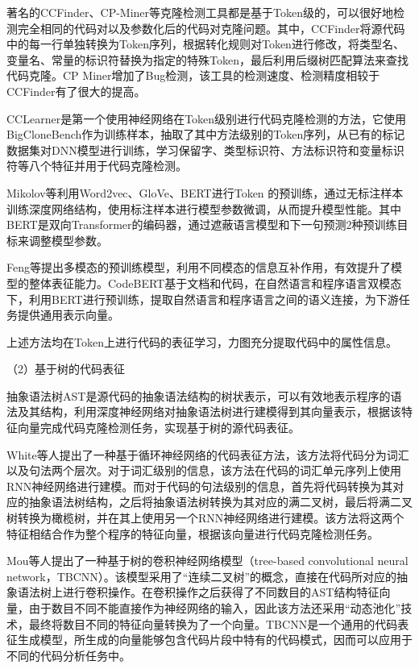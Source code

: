 著名的CCFinder\cite{1019480}、CP-Miner\cite{1610609}等克隆检测工具都是基于Token级的，可以很好地检测完全相同的代码对以及参数化后的代码对克隆问题。其中，CCFinder将源代码中的每一行单独转换为Token序列，根据转化规则对Token进行修改，将类型名、变量名、常量的标识符替换为指定的特殊Token，最后利用后缀树匹配算法来查找代码克隆。CP Miner增加了Bug检测，该工具的检测速度、检测精度相较于CCFinder有了很大的提高。

CCLearner\cite{10.1145/1287624.1287634}是第一个使用神经网络在Token级别进行代码克隆检测的方法，它使用BigCloneBench\cite{7332459}作为训练样本，抽取了其中方法级别的Token序列，从已有的标记数据集对DNN模型进行训练，学习保留字、类型标识符、方法标识符和变量标识符等八个特征并用于代码克隆检测。

Mikolov等\cite{pennington-etal-2014-glove}利用Word2vec、GloVe、BERT进行Token 的预训练，通过无标注样本训练深度网络结构，使用标注样本进行模型参数微调，从而提升模型性能。其中BERT\cite{devlin-etal-2019-bert}是双向Transformer的编码器，通过遮蔽语言模型和下一句预测2种预训练目标来调整模型参数。

Feng等\cite{Feng2020CodeBERTAP}提出多模态的预训练模型，利用不同模态的信息互补作用，有效提升了模型的整体表征能力。CodeBERT基于文档和代码，在自然语言和程序语言双模态下，利用BERT进行预训练，提取自然语言和程序语言之间的语义连接，为下游任务提供通用表示向量。

上述方法均在Token上进行代码的表征学习，力图充分提取代码中的属性信息。

（2）基于树的代码表征

抽象语法树AST是源代码的抽象语法结构的树状表示，可以有效地表示程序的语法及其结构，利用深度神经网络对抽象语法树进行建模得到其向量表示，根据该特征向量完成代码克隆检测任务，实现基于树的源代码表征。

White等人\cite{White2016DeepLC}提出了一种基于循环神经网络的代码表征方法，该方法将代码分为词汇以及句法两个层次。对于词汇级别的信息，该方法在代码的词汇单元序列上使用 RNN神经网络进行建模。而对于代码的句法级别的信息，首先将代码转换为其对应的抽象语法树结构，之后将抽象语法树转换为其对应的满二叉树，最后将满二叉树转换为橄榄树，并在其上使用另一个RNN神经网络进行建模。该方法将这两个特征相结合作为整个程序的特征向量，根据该向量进行代码克隆检测任务。

Mou等人\cite{WOS:000485474201046}提出了一种基于树的卷积神经网络模型（tree-based convolutional neural network，TBCNN）。该模型采用了“连续二叉树”的概念，直接在代码所对应的抽象语法树上进行卷积操作。在卷积操作之后获得了不同数目的AST结构特征向量，由于数目不同不能直接作为神经网络的输入，因此该方法还采用“动态池化”技术，最终将数目不同的特征向量转换为了一个向量。TBCNN是一个通用的代码表征生成模型，所生成的向量能够包含代码片段中特有的代码模式，因而可以应用于不同的代码分析任务中。


